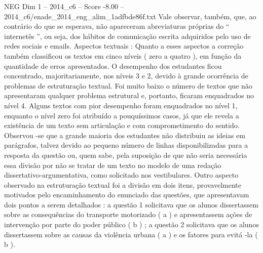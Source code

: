 \begin{textsample}{NEG Dim 1 – 2014\_c6 – Score -8.00 – 2014\_c6/enade\_2014\_eng\_alim\_1adfbde86f.txt}
Vale observar, também, que, ao contrário do que se esperava, não apareceram abreviaturas próprias do “ internetês ”, ou seja, dos hábitos de comunicação escrita adquiridos pelo uso de redes sociais e emails.
Aspectos textuais : Quanto a esses aspectos a correção também classificou os textos em cinco níveis ( zero a quatro ), em função da quantidade de erros apresentados.
O desempenho dos estudantes ficou concentrado, majoritariamente, nos níveis 3 e 2, devido à grande ocorrência de problemas de estruturação textual.
Foi muito baixo o número de textos que não apresentaram qualquer problema estrutural e, portanto, ficaram enquadrados no nível 4.
Alguns textos com pior desempenho foram enquadrados no nível 1, enquanto o nível zero foi atribuído a pouquíssimos casos, já que ele revela a existência de um texto sem articulação e com comprometimento do sentido.
Observou -se que a grande maioria dos estudantes não distribuiu as ideias em parágrafos, talvez devido ao pequeno número de linhas disponibilizadas para a resposta da questão ou, quem sabe, pela suposição de que não seria necessária essa divisão por não se tratar de um texto no modelo de uma redação dissertativo-argumentativa, como solicitado nos vestibulares.
Outro aspecto observado na estruturação textual foi a divisão em dois itens, provavelmente motivados pelo encaminhamento do enunciado das questões, que apresentavam dois pontos a serem detalhados : a questão 1 solicitava que os alunos dissertassem sobre as consequências do transporte motorizado ( a ) e apresentassem ações de intervenção por parte do poder público ( b ) ; a questão 2 solicitava que os alunos dissertassem sobre as causas da violência urbana ( a ) e os fatores para evitá -la ( b ).

\end{textsample}
